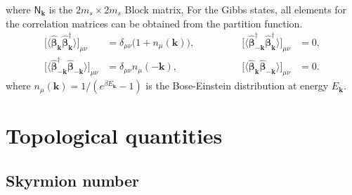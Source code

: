 \documentclass[aps, prx, nofootinbib, superscriptaddress]{revtex4-2}
\newcommand{\kvec}{\mathbf{k}}
\begin{document}
where $\mathsf{N}_{\kvec}$ is the $2m_{s} \times 2m_{s}$ Block matrix, 
For the Gibbs states, all elements for the correlation matrices can be obtained from the partition function. 
\begin{equation}
    \begin{array}{rlrl}
        \big[ \langle \hat{\bm \beta}_{ \kvec}^{\phantom \dagger} \hat{\bm \beta}_{ \kvec}^{\dagger} \rangle \big]_{\mu\nu} 
        & = \delta_{\mu\nu} \big( 1 + n_{\mu}(\kvec) \big) , 
        \qquad & \qquad 
        \big[ \langle \hat{\bm\beta}_{-\kvec}^{\dagger} \hat{\bm\beta}_{\kvec}^{\dagger} \rangle \big]_{\mu\nu} & = 0  ,
        \\[0.5em]
        \big[ \langle \hat{\bm\beta}_{-\kvec}^{\dagger} \hat{\bm\beta}_{- \kvec}^{\phantom \dagger} \rangle \big]_{\mu\nu}
        & = \delta_{\mu\nu} n_{\mu}(-\kvec) ,
        \qquad & \qquad 
        \big[ \langle \hat{\bm\beta}_{\kvec} \hat{\bm\beta}_{-\kvec} \rangle \big]_{\mu\nu} & = 0.
    \end{array}
\end{equation}
where $n_{\mu}(\kvec) = 1/(e^{\beta E_{\kvec}} - 1)$ is the Bose-Einstein distribution at energy $E_{\kvec}$. 








\newpage

\section{Topological quantities}\label{app:topology}

\subsection{Skyrmion number}\label{subsec: Skyrmion number}
\end{document}

